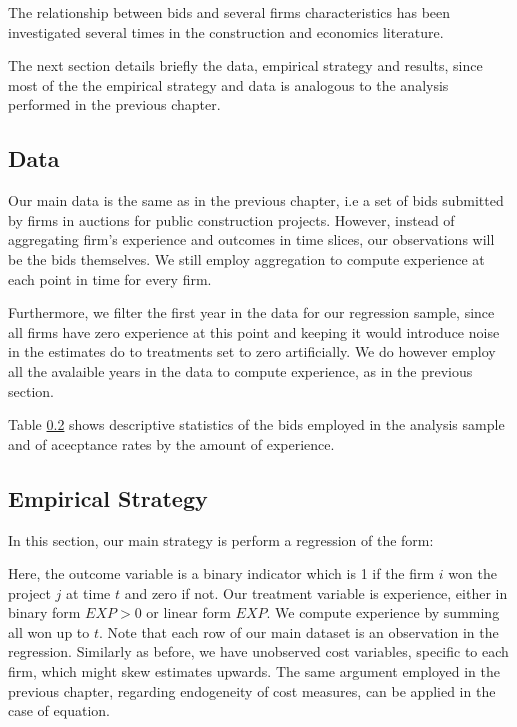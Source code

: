 The relationship between bids and several firms characteristics has been investigated several times in the construction and economics literature.

The next section details briefly the data, empirical strategy and results, since most of the the empirical strategy and data is analogous to the analysis performed in the previous chapter.

\subsection{Data}

Our main data is the same as in the previous chapter, i.e a set of bids submitted by firms in auctions for public construction projects. However, instead of aggregating firm's experience and outcomes in time slices, our observations will be the bids themselves. We still employ aggregation to compute experience at each point in time for every firm.

Furthermore, we filter the first year in the data for our regression sample, since all firms have zero experience at this point and keeping it would introduce noise in the estimates do to treatments set to zero artificially. We do however employ all the avalaible years in the data to compute experience, as in the previous section.

Table \ref{} shows descriptive statistics of the bids employed in the analysis sample and of acecptance rates by the amount of experience.



\subsection{Empirical Strategy}
In this section, our main strategy is perform a regression of the form:

 Here, the outcome variable is a binary indicator which is 1 if the firm $i$ won the project $j$ at time $t$ and zero if not. Our treatment variable is experience, either in binary form $EXP>0$ or linear form $EXP$. We compute experience by summing all won up to $t$. Note that each row of our main dataset is an observation in the regression.
Similarly as before, we have unobserved cost variables, specific to each firm, which might skew estimates upwards. The same argument employed in the previous chapter, regarding endogeneity of cost measures, can be applied in the case of equation.

